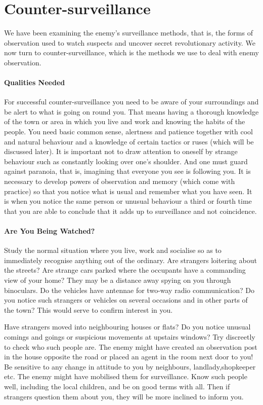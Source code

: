 \section{Counter-surveillance}

We have been examining the enemy's surveillance methods, that is, the
forms of observation used to watch suspects and uncover secret
revolutionary activity. We now turn to counter-surveillance, which is
the methods we use to deal with enemy observation.

\paragraph{Qualities Needed}

For successful counter-surveillance you need to be aware of your
surroundings and be alert to what is going on round you. That means
having a thorough knowledge of the town or area in which you live and
work and knowing the habits of the people. You need basic common sense,
alertness and patience together with cool and natural behaviour and a
knowledge of certain tactics or ruses (which will be discussed later).
It is important not to draw attention to oneself by strange behaviour
such as constantly looking over one's shoulder. And one must guard
against paranoia, that is, imagining that everyone you see is following
you. It is necessary to develop powers of observation and memory (which
come with practice) so that you notice what is usual and remember what
you have seen. It is when you notice the same person or unusual
behaviour a third or fourth time that you are able to conclude that it
adds up to surveillance and not coincidence.

\paragraph{Are You Being Watched?}

Study the normal situation where you live, work and socialise so as to
immediately recognise anything out of the ordinary. Are strangers
loitering about the streets? Are strange cars parked where the occupants
have a commanding view of your home? They may be a distance away spying
on you through binoculars. Do the vehicles have antennae for two-way
radio communication? Do you notice such strangers or vehicles on several
occasions and in other parts of the town? This would serve to confirm
interest in you.

Have strangers moved into neighbouring houses or flats? Do you notice
unusual comings and goings or suspicious movements at upstairs windows?
Try discreetly to check who such people are. The enemy might have
created an observation post in the house opposite the road or placed an
agent in the room next door to you! Be sensitive to any change in
attitude to you by neighbours, landlady,shopkeeper etc. The enemy might
have mobilised them for surveillance. Know such people well, including
the local children, and be on good terms with all. Then if strangers
question them about you, they will be more inclined to inform you.

